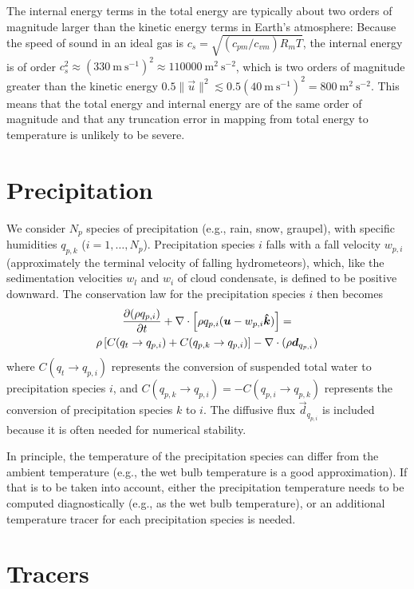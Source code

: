 \documentclass{report}
\begin{document}
The internal energy terms in the total energy are typically about two orders of magnitude larger than the kinetic energy terms in Earth's atmosphere: Because the speed of sound in an ideal gas is $c_s = \sqrt{(c_{pm}/c_{vm}) R_m T}$, the internal energy is of order $c_s^2 \approx (330~\mathrm{m~s^{-1}})^2 \approx 110000~\mathrm{m^2~s^{-2}}$, which is two orders of magnitude greater than the kinetic energy $0.5 \|\vec{u}\|^2 \lesssim 0.5(40~\mathrm{m~s^{-1}})^2 = 800~\mathrm{m^2~s^{-2}}$. This means that the total energy and internal energy are of the same order of magnitude and that any truncation error in mapping from total energy to temperature is unlikely to be severe.

\section{Precipitation}

We  consider $N_p$ species of precipitation (e.g., rain, snow, graupel), with specific humidities $q_{p,k}$ ($i=1,\dots,N_p$). Precipitation species $i$ falls with a fall velocity $w_{p,i}$ (approximately the terminal velocity of falling hydrometeors), which, like the sedimentation velocities $w_l$ and $w_i$ of cloud condensate, is defined to be positive downward. The conservation law for the precipitation species $i$ then becomes
\begin{multline}
\frac{\partial (\rho q_{p,i})}{\partial t} + \nabla \cdot \left[\rho q_{p,i} (\boldsymbol{{u}} - w_{p,i} \boldsymbol{{\hat k}}) \right] =\\
\rho \left[C(q_t \rightarrow q_{p,i}) + C(q_{p,k} \rightarrow q_{p,i}) \right] -\nabla \cdot (\rho \boldsymbol{{d}}_{q_{p, i}})
\label{e:precip}
\end{multline}
where $C(q_t \rightarrow q_{p,i})$ represents the conversion of suspended total water to precipitation species $i$, and $C(q_{p,k} \rightarrow q_{p,i}) = -C(q_{p,i} \rightarrow q_{p,k})$ represents the conversion of precipitation species $k$ to $i$. The diffusive flux $\vec{d}_{q_{p, i}}$ is included because it is often needed for numerical stability.

In principle, the temperature of the precipitation species can differ from the ambient temperature (e.g., the wet bulb temperature is a good approximation). If that is to be taken into account, either the precipitation temperature needs to be computed diagnostically (e.g., as the wet bulb temperature), or an additional temperature tracer for each precipitation species is needed.

\section{Tracers}
\end{document}
